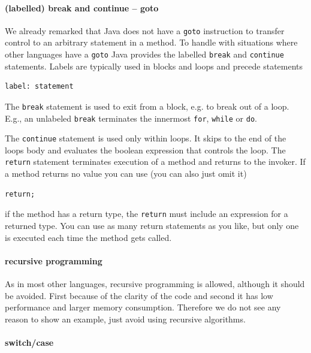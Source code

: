 \paragraph{(labelled) break and continue -- goto}
We already remarked that Java does not have a \verb|goto| instruction
to transfer control to an arbitrary statement in a method. To handle
with situations where other languages have a \verb|goto| Java provides
the labelled \verb|break| and \verb|continue| statements. Labels are
typically used in blocks and loops and precede statements
\begin{verbatim}
label: statement
\end{verbatim}
The \verb|break| statement is used to exit from a block, e.g. to break
out of a loop. E.g., an unlabeled \verb|break| terminates the innermost
\verb|for|, \verb|while| or \verb|do|.

The \verb|continue| statement is used only within loops. It skips to
the end of the loops body and evaluates the boolean expression that
controls the loop. The \verb|return| statement terminates execution of
a method and returns to the invoker. If a method returns no value you
can use (you can also just omit it)
\begin{verbatim}
return;
\end{verbatim}
if the method has a return type, the \verb|return| must include an
expression for a returned type. You can use as many return statements 
as you like, but only one is executed each time the method gets called.

\paragraph{recursive programming}
As in most other languages, recursive programming is allowed, although
it should be avoided. First because of the clarity of the code
and second it has low performance and larger memory consumption. 
Therefore we do not see any reason to show an example, just
avoid using recursive algorithms.

\paragraph{switch/case}

